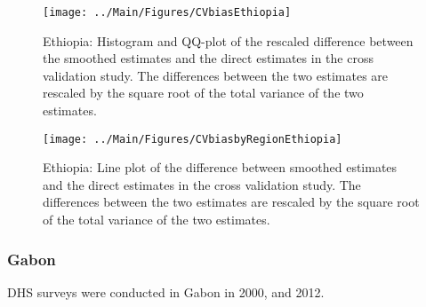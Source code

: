\documentclass[12pt]{article}\usepackage[]{graphicx}\usepackage[]{color}
\newenvironment{knitrout}{}{} %
\begin{document}
\begin{knitrout}
\color{fgcolor}\begin{figure}[bht]

{\centering \texttt{[image: ../Main/Figures/CVbiasEthiopia]} 

}

\caption[Ethiopia]{Ethiopia: Histogram and QQ-plot of the rescaled difference between the smoothed estimates and the direct estimates in the cross validation study. The differences between the two estimates are rescaled by the square root of the total variance of the two estimates.}\label{fig:unnamed-chunk-119}
\end{figure}


\end{knitrout}

\begin{knitrout}
\color{fgcolor}\begin{figure}[bht]

{\centering \texttt{[image: ../Main/Figures/CVbiasbyRegionEthiopia]} 

}

\caption[Ethiopia]{Ethiopia: Line plot of the difference between smoothed estimates and the direct estimates in the cross validation study. The differences between the two estimates are rescaled by the square root of the total variance of the two estimates.}\label{fig:unnamed-chunk-120}
\end{figure}


\end{knitrout}


\clearpage
\subsubsection{Gabon}





DHS surveys were conducted in Gabon in 2000, and 2012.
\end{document}
